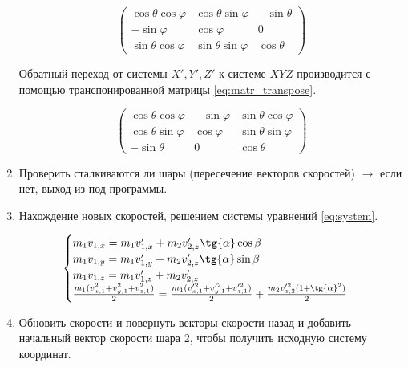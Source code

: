 \begin{enumerate}
	\begin{equation}
		\begin{pmatrix}
			\cos{\theta}\cos{\varphi}& \cos{\theta}\sin{\varphi} & -\sin{\theta}\\
			-\sin{\varphi}& \cos{\varphi} & 0\\
			\sin{\theta}\cos{\varphi}&\sin{\theta}\sin{\varphi}&\cos{\theta}
		\end{pmatrix}
		\label{eq:matr_rotate}
	\end{equation}
	
	Обратный переход от системы $X',Y',Z'$ к системе $XYZ$ производится с помощью транспонированной матрицы \ref{eq:matr_transpose}. 
	
	\begin{equation}
		\begin{pmatrix}
			\cos{\theta}\cos{\varphi}& -\sin{\varphi} & \sin{\theta}\cos{\varphi}\\
			\cos{\theta}\sin{\varphi}& \cos{\varphi} & \sin{\theta}\sin{\varphi}\\
			-\sin{\theta}&0&\cos{\theta}
		\end{pmatrix}
		\label{eq:matr_transpose}
	\end{equation}
	
	\item Проверить сталкиваются ли шары (пересечение векторов скоростей) $\to$ если нет, выход из-под программы. 
	\item Нахождение новых скоростей, решением системы уравнений \ref{eq:system}.  
	
	\begin{equation}
		\begin{cases}
			m_1 v_{1,x} = m_1 v_{1,x}' + m_2 v_{2,z}' \tg{\alpha}\cos{\beta}\\
			m_1 v_{1,y} = m_1 v_{1,y}' + m_2 v_{2,z}'\tg{\alpha}\sin{\beta}\\
			m_1 v_{1,z} = m_1 v_{1,z}' + m_2 v_{2,z}'\\
			\frac{m_1(v_{x,1}^2+v_{y,1}^2+v_{z,1}^2) }{2} =  \frac{m_1(v_{x,1}'^2+v_{y,1}'^2+v_{z,1}'^2)}{2} + \frac{m_2v_{z,2}'^2(1+\tg{\alpha}^2)}{2} 
		\end{cases}
		\label{eq:system}
	\end{equation}

	\item Обновить скорости и повернуть векторы скорости назад и добавить начальный вектор скорости шара 2, чтобы получить исходную систему координат. 
	
\end{enumerate}

